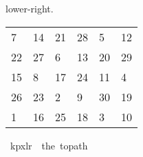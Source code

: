 \begin{isabellebody}
\begin{isamarkuptext}
lower-right.
  \begin{table}[H]
    \begin{tabular}{llllll}
       7 & 14 & 21 & 28 &  5 & 12 \\
      22 & 27 &  6 & 13 & 20 & 29 \\
      15 &  8 & 17 & 24 & 11 &  4 \\
      26 & 23 &  2 &  9 & 30 & 19 \\
       1 & 16 & 25 & 18 &  3 & 10
    \end{tabular}
  \end{table}%
\end{isamarkuptext}\isamarkuptrue%
\isamarkupfalse%
\ {\isachardoublequoteopen}kp{}x{}lr\ {\isasymequiv}\ the\ {\isacharparenleft}{\kern0pt}to{\isacharunderscore}{\kern0pt}path\ \isanewline
\ \ {\isacharbrackleft}{\kern0pt}{\isacharbrackleft}{\kern0pt}{}{\isacharcomma}{\kern0pt}{}{}{\isacharcomma}{\kern0pt}{}{}{\isacharcomma}{\kern0pt}{}{}{\isacharcomma}{\kern0pt}{}{\isacharcomma}{\kern0pt}{}{}{\isacharbrackright}{\kern0pt}{\isacharcomma}{\kern0pt}\isanewline
\ \ {\isacharbrackleft}{\kern0pt}{}{}{\isacharcomma}{\kern0pt}{}{}{\isacharcomma}{\kern0pt}{}{\isacharcomma}{\kern0pt}{}{}{\isacharcomma}{\kern0pt}{}{}{\isacharcomma}{\kern0pt}{}{}{\isacharbrackright}{\kern0pt}{\isacharcomma}{\kern0pt}\isanewline
\ \ {\isacharbrackleft}{\kern0pt}{}{}{\isacharcomma}{\kern0pt}{}{\isacharcomma}{\kern0pt}{}{}{\isacharcomma}{\kern0pt}{}{}{\isacharcomma}{\kern0pt}{}{}{\isacharcomma}{\kern0pt}{}{\isacharbrackright}{\kern0pt}{\isacharcomma}{\kern0pt}\isanewline
\ \ {\isacharbrackleft}{\kern0pt}{}{}{\isacharcomma}{\kern0pt}{}{}{\isacharcomma}{\kern0pt}{}{\isacharcomma}{\kern0pt}{}{\isacharcomma}{\kern0pt}{}{}{\isacharcomma}{\kern0pt}{}{}{\isacharbrackright}{\kern0pt}{\isacharcomma}{\kern0pt}\isanewline
\ \ {\isacharbrackleft}{\kern0pt}{}{\isacharcomma}{\kern0pt}{}{}{\isacharcomma}{\kern0pt}{}{}{\isacharcomma}{\kern0pt}{}{}{\isacharcomma}{\kern0pt}{}{\isacharcomma}{\kern0pt}{}{}{\isacharbrackright}{\kern0pt}{\isacharbrackright}{\kern0pt}{\isacharparenright}{\kern0pt}{\isachardoublequoteclose}\isanewline

\end{isabellebody}
